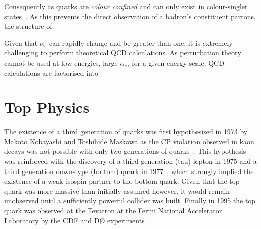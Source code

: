 Consequently as quarks are \emph{colour confined} and can only exist in colour-singlet states~\cite{ElectroweakStrong,Griffiths,devenish2004deep}.
As this prevents the direct observation of a hadron's constituent partons, the structure of 

Given that $\alpha_{s}$ can rapidly change and be greater than one, it is extremely challenging to perform theoretical QCD calculations.
As perturbation theory cannot be used at low energies, \ie large $\alpha_{s}$, for a given energy scale, QCD calculations are factorised into  





%





%

\section{Top Physics}\label{sec:top-physics}
The existence of a third generation of quarks was first hypothesised in 1973 by Makoto Kobayashi and Toshihide Maskawa as the CP violation observed in kaon decays was not possible with only two generations of quarks~\cite{Kobayashi:1973fv}.
This hypothesis was reinforced with the discovery of a third generation (tau) lepton in 1975 and a third generation down-type (bottom) quark in 1977~\cite{Herb:1977ek}, which strongly implied the existence of a weak isospin partner to the bottom quark.
Given that the top quark was more massive than initially assumed however, it would remain unobserved until a sufficiently powerful collider was built.
Finally in 1995 the top quark was observed at the Tevatron at the Fermi National Accelerator Laboratory by the CDF and D\O\xspace experiments~\cite{Abe:1995hr,D0:1995jca}.

